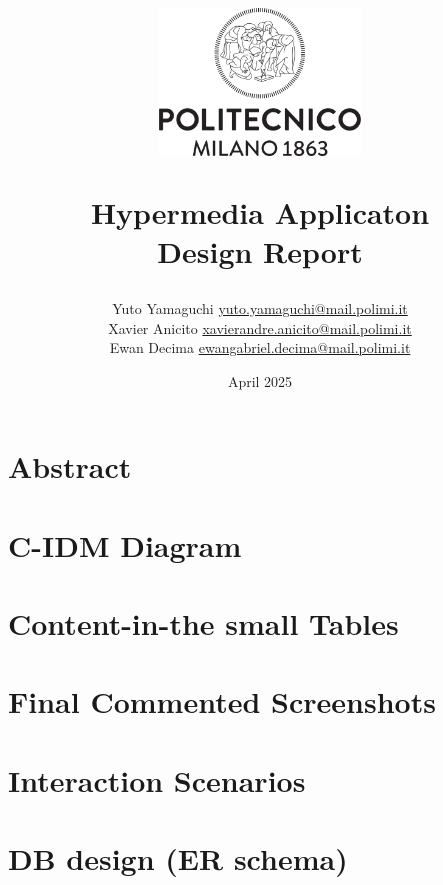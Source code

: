 \documentclass{article}
\title{
        \vspace{-2cm}
        \begin{center}
                \includegraphics[width=0.4\textwidth]{asset/logo.png} %
        \end{center}
        \vspace{1cm}
        \textbf{Hypermedia Applicaton \\ Design Report}
}
\author{Yuto Yamaguchi \href{mailto:yuto.yamaguchi@mail.polimi.it}{yuto.yamaguchi@mail.polimi.it} \\
Xavier Anicito \href{mailto:xavierandre.anicito@mail.polimi.it}{xavierandre.anicito@mail.polimi.it} \\
Ewan Decima \href{mailto:ewangabriel.decima@mail.polimi.it}{ewangabriel.decima@mail.polimi.it}
}
\date{April 2025}
\begin{document}
\maketitle
\tableofcontents
\newpage

\section{Abstract}

\section{C-IDM Diagram}

\section{Content-in-the small Tables}

\section{Final Commented Screenshots}

\section{Interaction Scenarios}

\section{DB design (ER schema)}
\end{document}
